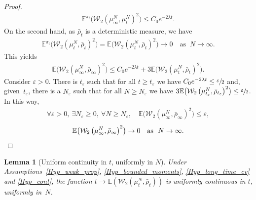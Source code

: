 \documentclass[JEP,XML,SOM,Unicode,published]{cedram}
\let\epsilon\varepsilon
\theoremstyle{plain}
\newtheorem{lemma}{Lemma}[section]
\theoremstyle{definition}
\begin{document}
\begin{proof}
\begin{align*}
\mathbb{E}^{\pi_t}\bigl(\mathcal{W}_2\left(\mu^N_{\infty},\mu^N_{t}\right)^2\bigr)\leq C_0e^{-2\lambda t}.
\end{align*}
On the second hand, as $\bar{\rho}_{t}$ is a deterministic measure, we have
\begin{align*}
\mathbb{E}^{\pi_t}\bigl(\mathcal{W}_2\left(\mu^N_{t},\bar{\rho}_{t}\right)^2\bigr)=\mathbb{E}\bigl(\mathcal{W}_2\left(\mu^N_{t},\bar{\rho}_{t}\right)^2\bigr)\to 0\quad\text{as }\ N\to\infty.
\end{align*}
This yields
\begin{align*}
\mathbb{E}\bigl(\mathcal{W}_2\left(\mu^N_{\infty},\bar{\rho}_{\infty}\right)^2\bigr)\leq C_0e^{-2\lambda t}+3\mathbb{E}\bigl(\mathcal{W}_2\left(\mu^N_{t},\bar{\rho}_{t}\right)^2\bigr).
\end{align*}
Consider $\epsilon>0$. There is $t_\epsilon$ such that for all $t\geq t_\epsilon$ we have $C_0e^{-2\lambda t}\leq\sfrac{\epsilon}{2}$ and, given~$t_\epsilon$, there is a $N_\epsilon$ such that for all $N\geq N_\epsilon$ we have ${3\mathbb{E}\bigl(\mathcal{W}_2\left(\mu^{N}_{t_\epsilon},\bar{\rho}_{t_\epsilon} \right)^2 \bigr)\leq\sfrac{\epsilon}{2}}$. In this way,
\begin{align*}
\forall \epsilon >0,\ \exists N_\epsilon \geq0,\ \forall N\geq N_\epsilon,\quad \mathbb{E}\bigl(\mathcal{W}_2\left(\mu^N_{\infty},\bar{\rho}_{\infty} \right)^2 \bigr)\leq\epsilon,
\end{align*}
\ie
\[
\mathbb{E}\bigl(\mathcal{W}_2\left(\mu^N_{\infty},\bar{\rho}_{\infty}\right)^2\bigr)\to 0\quad\text{as }\ N\to\infty.\qedhere
\]
\end{proof}

\begin{lemma}[Uniform continuity in $t$, uniformly in $N$]\label{cont_unif}
Under Assumptions~\ref{Hyp_weak_prop}, \ref{Hyp_bounded_moments}, \ref{Hyp_long_time_cv} and \ref{Hyp_cont}, the function $t\!\to\!\mathbb{E}\left(\mathcal{W}_2\left(\mu^N_{t},\bar{\rho}_{t}\right)\right)$ is uniformly continuous in $t$, uniformly in~$N$.
\end{lemma}
\end{document}

